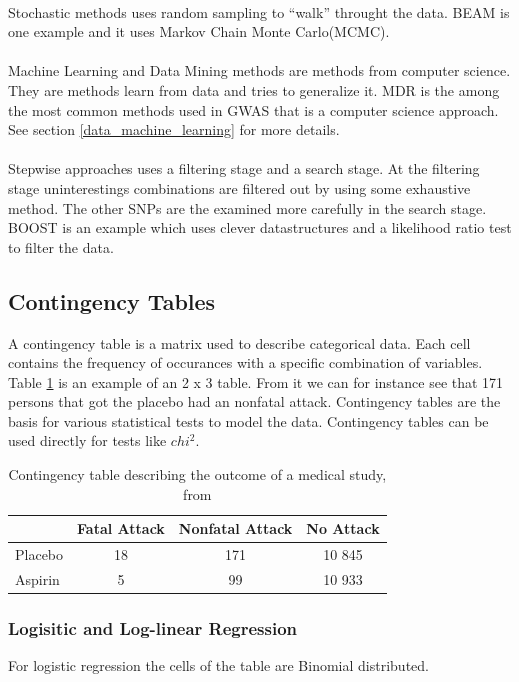 \documentclass[10pt,a4paper]{article}
\begin{document}
\\
Stochastic methods uses random sampling to ``walk'' throught the data. BEAM\cite{beam_2007} is one example and it uses Markov Chain Monte Carlo(MCMC).\\
\\
Machine Learning and Data Mining methods are methods from computer science. They are methods learn from data and tries to generalize it. MDR\cite{mdr_2001} is the among the most common methods used in GWAS that is a computer science approach. See section \ref{data_machine_learning} for more details.\\
\\
Stepwise approaches uses a filtering stage and a search stage. At the filtering stage uninterestings combinations are filtered out by using some exhaustive method. The other SNPs are the examined more carefully in the search stage. BOOST\cite{boost_gene_gene} is an example which uses clever datastructures and a likelihood ratio test to filter the data.

\subsection{Contingency Tables}
A contingency table is a matrix used to describe categorical data. Each cell contains the frequency of occurances with a specific combination of variables. Table \ref{table:contingency_table} is an example of an 2 x 3 table. From it we can for instance see that 171 persons that got the placebo had an nonfatal attack. Contingency tables are the basis for various statistical tests to model the data. Contingency tables can be used directly for tests like $chi^2$. \cite{agresti_categorical}

\begin{table}[h]
\begin{tabular}{ l c c c }
  \hline
  & Fatal Attack & Nonfatal Attack & No Attack\\
  \hline
  Placebo & 18 & 171 & 10 845 \\
  Aspirin & 5 & 99 & 10 933 \\
  \hline  
\end{tabular}
\caption{Contingency table describing the outcome of a medical study, from \cite{agresti_categorical}}
\label{table:contingency_table}
\end{table}

\subsubsection{Logisitic and Log-linear Regression}
For logistic regression the cells of the table are Binomial distributed.\cite{agresti_categorical}
\end{document}
